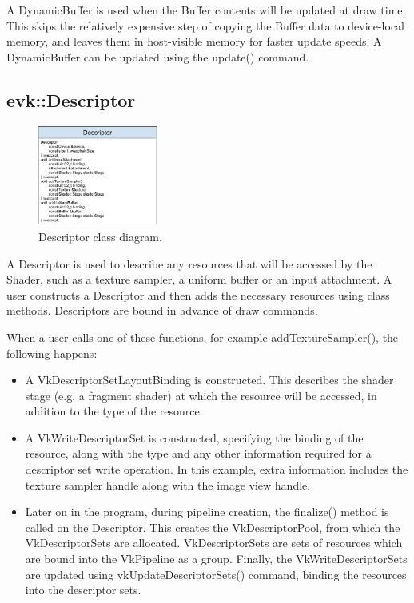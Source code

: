 \documentclass[12pt]{report}
\theoremstyle{definition}
\begin{document}
        A DynamicBuffer is used when the Buffer contents will be updated at
        draw time. This skips the relatively expensive step of copying the
        Buffer data to device-local memory, and leaves them in host-visible
        memory for faster update speeds. A DynamicBuffer can be updated
        using the update() command.

      \subsection{evk::Descriptor}

        \begin{figure}[h]
          \centering
          \includegraphics[width=0.35\textwidth]{images/class_descriptor.png}
          \caption{Descriptor class diagram.}
          \label{fig:class_descriptor}
        \end{figure}

        A Descriptor is used to describe any resources that will be accessed by
        the Shader, such as a texture sampler, a uniform buffer or an input
        attachment. A user constructs a Descriptor and then adds the necessary
        resources using class methods. Descriptors are bound in advance of draw
        commands.

        When a user calls one of these functions, for example
        addTextureSampler(), the following happens:

        \begin{itemize}
          \item A VkDescriptorSetLayoutBinding is constructed. This describes
            the shader stage (e.g. a fragment shader) at which the resource
            will be accessed, in addition to the type of the resource.
          \item A VkWriteDescriptorSet is constructed, specifying the binding
            of the resource, along with the type and any other information
            required for a descriptor set write operation. In this example,
            extra information includes the texture sampler handle along with
            the image view handle.
          \item Later on in the program, during pipeline creation, the
            finalize() method is called on the Descriptor. This creates the
            VkDescriptorPool, from which the VkDescriptorSets are allocated.
            VkDescriptorSets are sets of resources which are bound into the
            VkPipeline as a group. Finally, the VkWriteDescriptorSets are
            updated using vkUpdateDescriptorSets() command, binding the
            resources into the descriptor sets.
        \end{itemize}
\end{document}

